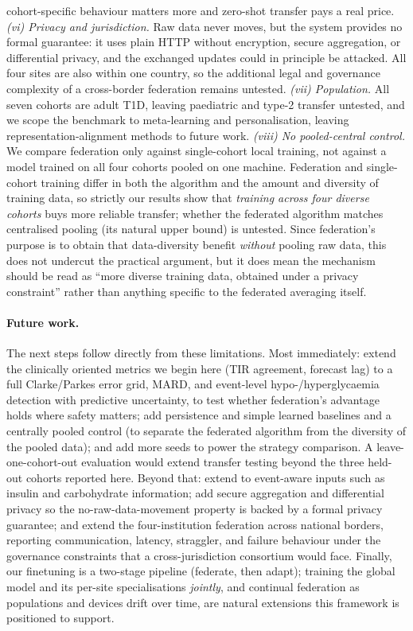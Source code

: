 \documentclass[10pt,letterpaper]{article}
\begin{document}
cohort-specific behaviour matters more and zero-shot transfer pays a real price. \emph{(vi) Privacy and jurisdiction.} Raw data never moves, but the system
provides no formal guarantee: it uses plain HTTP without encryption, secure
aggregation, or differential privacy, and the exchanged updates could in principle
be attacked. All four sites are also within one country, so the additional legal
and governance complexity of a cross-border federation remains untested. \emph{(vii) Population.} All seven cohorts
are adult T1D, leaving paediatric and type-2 transfer untested, and we scope the
benchmark to meta-learning and personalisation, leaving representation-alignment
methods to future work. \emph{(viii) No pooled-central control.} We compare
federation only against single-cohort local training, not against a model trained
on all four cohorts pooled on one machine. Federation and single-cohort training
differ in both the algorithm and the amount and diversity of training data, so
strictly our results show that \emph{training across four diverse cohorts} buys
more reliable transfer; whether the federated algorithm matches centralised
pooling (its natural upper bound) is untested. Since federation's purpose is to
obtain that data-diversity benefit \emph{without} pooling raw data, this does not
undercut the practical argument, but it does mean the mechanism should be read as
``more diverse training data, obtained under a privacy constraint'' rather than
anything specific to the federated averaging itself.

\paragraph{Future work.} The next steps follow directly from these limitations.
Most immediately: extend the clinically oriented metrics we begin here (TIR
agreement, forecast lag) to a full Clarke/Parkes error grid, MARD, and event-level
hypo-/hyperglycaemia detection with predictive uncertainty, to test whether
federation's advantage holds where safety matters; add persistence and simple
learned baselines and a centrally pooled control (to separate the federated
algorithm from the diversity of the pooled data); and add more seeds to power the
strategy comparison. A leave-one-cohort-out evaluation would extend transfer
testing beyond the three held-out cohorts reported here. Beyond that: extend to
event-aware inputs such as insulin and carbohydrate information; add secure
aggregation and differential privacy so the no-raw-data-movement property is
backed by a formal privacy guarantee; and extend the four-institution federation
across national borders, reporting communication, latency, straggler, and failure
behaviour under the governance constraints that a cross-jurisdiction consortium
would face. Finally, our finetuning is a two-stage pipeline (federate, then adapt);
training the global model and its per-site specialisations \emph{jointly}, and
continual federation as populations and devices drift over time, are natural
extensions this framework is positioned to support.



\end{document}
